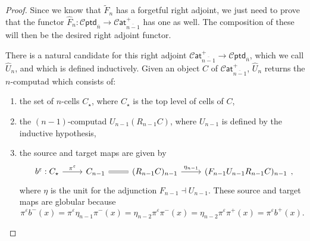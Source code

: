 \documentclass[12pt,a4paper]{article}
\numberwithin{equation}{section}
\newcommand{\cat}[1]{\mathscr{C} \mathsf{at}_{\overline{#1}}}
\newcommand{\cptd}[1]{\mathscr{C} \mathsf{ptd}_{\overline{#1}}}
\begin{document}
\begin{proof}
    Since we know that $\tilde{F}_n$ has a forgetful right adjoint, we just need to prove that the functor $\hat{F}_n: \cptd{n} \to \cat{n-1}^+$ has one as well. The composition of these will then be the desired right adjoint functor.

    There is a natural candidate for this right adjoint $\cat{n-1}^+ \to \cptd{n}$, which we call $\hat{U}_n$, and which is defined inductively. Given an object $C$ of $\cat{n-1}^+$, $\hat{U}_n$ returns the $n$-computad which consists of:
    \begin{enumerate}
        \item the set of $n$-cells $C_\star$, where $C_\star$ is the top level of cells of $C$,
        \item the $(n-1)$-computad $U_{n-1} (R_{n-1} C)$, where $U_{n-1}$ is defined by the inductive hypothesis,
        \item the source and target maps are given by
        \begin{equation}
            \begin{tikzcd}
                b^\varepsilon: C_\star \arrow[r, "\pi^\varepsilon"] & C_{n-1} \arrow[r, Rightarrow, no head] & (R_{n-1} C)_{n-1} \arrow[r, "\eta_{n-1}"] & (F_{n-1} U_{n-1} R_{n-1} C)_{n-1}
            \end{tikzcd},
        \end{equation}
        where $\eta$ is the unit for the adjunction $F_{n-1} \dashv U_{n-1}$. These source and target maps are globular because
        \begin{equation}
            \pi^\varepsilon b^- (x) = \pi^\varepsilon \eta_{n-1} \pi^- (x) = \eta_{n-2} \pi^\varepsilon \pi^- (x)= \eta_{n-2} \pi^\varepsilon \pi^+ (x) = \pi^\varepsilon b^+ (x).
        \end{equation}
    \end{enumerate}


\end{proof}
\end{document}
